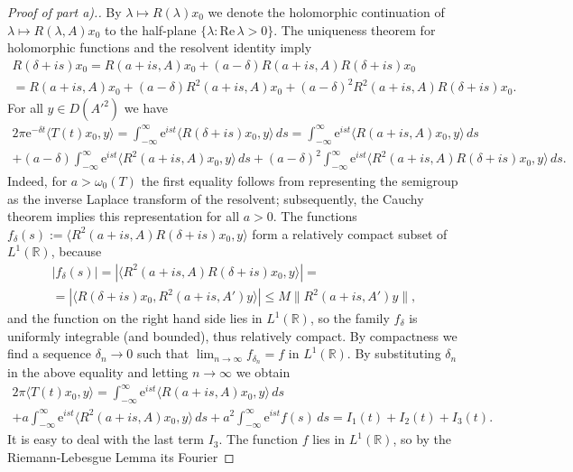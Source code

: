 \documentclass[11pt,intlimits, draft,oneside]{amsart}
\theoremstyle{definition}
\renewcommand{\Re}{\mathrm{Re}\,}
\def\dd{\,d}
\def\ee{\mathrm{e}}
\def\RR{\mathbb{R}}
\def\lm{\rightarrow}
\def\la{\langle}
\def\ra{\rangle}
\begin{document}
\begin{proof}[Proof of part a).] By $\lambda \mapsto R(\lambda)x_0$ we denote the holomorphic
continuation of $\lambda \mapsto R(\lambda,A)x_0$ to the half-plane
$\{\lambda:\Re \lambda >0 \}$. The uniqueness theorem for
holomorphic functions and the resolvent identity imply
\begin{multline*}
R(\delta+is)x_0=R(a+i s,A)x_0+(a-\delta)
R(a+i s,A)R(\delta+i s)x_0 \\
=R(a+i s,A)x_0+(a-\delta)R^2(a+i s,A)x_0 +(a-\delta)^2 R^2(a+i
s,A)R(\delta+i s)x_0.
\end{multline*}
For all $y\in D({A'}^2)$ we have
\begin{multline*}
2\pi\ee^{-\delta t} \la T(t)x_0,y\ra=\int_{-\infty}^{\infty} \ee^{i
st}\la R(\delta+i s)x_0,y\ra\dd s =\int_{-\infty}^{\infty} \ee^{i
st}\la R(a+i s,A)x_0,y\ra\dd
s\\
+(a-\delta)\int_{-\infty}^{\infty} \ee^{i st} \la R^2(a+i
s,A)x_0,y\ra\dd s +(a-\delta)^2\int_{-\infty}^{\infty} \ee^{i st}
\la R^2(a+i s,A)R(\delta+i s)x_0,y\ra\dd s.
\end{multline*}
Indeed, for $a>\omega_0(T)$ the first equality follows from
representing the semigroup as the inverse Laplace transform of the
resolvent; subsequently, the Cauchy theorem implies this
representation for all $a>0$. The functions $f_\delta(s):=\la
R^2(a+i s,A)R(\delta+i s)x_0,y\ra$ form a relatively compact subset
of $L^1(\RR)$, because
\begin{multline*}
|f_\delta(s)|=|\la R^2(a+i s,A)R(\delta+i s)x_0,y\ra|=\\ = |\la
R(\delta+i s)x_0,R^2(a+i s,A')y\ra| \leq M \|R^2(a+i s,A')y\|,
\end{multline*}
and the function on the right hand side lies in $L^1(\RR)$, so the
family $f_\delta$ is uniformly integrable (and bounded), thus
relatively compact. By compactness we find a sequence $\delta_n\lm
0$ such that $\lim_{n\to\infty} f_{\delta_n} = f$ in $L^1(\RR)$.
 By substituting $\delta_n$ in the above equality
and letting $n\lm\infty$ we obtain
\begin{multline*}
2\pi \la T(t)x_0,y\ra=\int_{-\infty}^{\infty} \ee^{i st}\la R(a+i
s,A)x_0,y\ra\dd s
\\ +a\int_{-\infty}^{\infty} \ee^{i st} \la R^2(a+i
s,A)x_0,y\ra\dd s + a^2\int_{-\infty}^{\infty} \ee^{i st} f(s)\dd s
=  I_1(t)+I_2(t)+I_3(t).
\end{multline*}
It is easy to deal with the last term $I_3$. The function $f$ lies
in $L^1(\RR)$, so by the Riemann-Lebesgue Lemma its Fourier

\end{proof}
\end{document}

